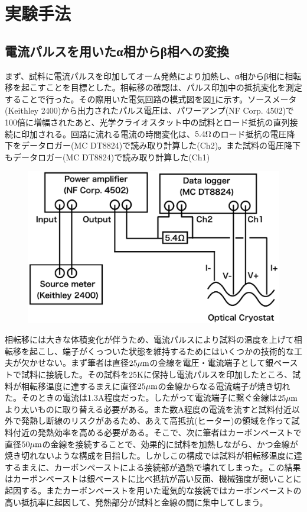 \section{実験手法}
\subsection{電流パルスを用いたα相からβ相への変換}
まず、試料に電流パルスを印加してオーム発熱により加熱し、α相からβ相に相転移を起こすことを目標とした。相転移の確認は、パルス印加中の抵抗変化を測定することで行った。その際用いた電気回路の模式図を図\ref{fig:schematics_pulse}に示す。ソースメータ(Keithley 2400)から出力されたパルス電圧は、パワーアンプ(NF Corp. 4502)で100倍に増幅されたあと、光学クライオスタット中の試料とロード抵抗の直列接続に印加される。回路に流れる電流の時間変化は、$\rm 5.4\Omega$のロード抵抗の電圧降下をデータロガー(MC DT8824)で読み取り計算した(Ch2)。また試料の電圧降下もデータロガー(MC DT8824)で読み取り計算した(Ch1)
\begin{figure}[!h]
    \begin{center}
   \includegraphics[width=0.5\hsize]{experiment/schematics_pulse.eps}
  \end{center}
  \caption{}
  \label{fig:schematics_pulse}
  \end{figure}
  
相転移には大きな体積変化が伴うため、電流パルスにより試料の温度を上げて相転移を起こし、端子がくっついた状態を維持するためにはいくつかの技術的な工夫が欠かせない。まず筆者は直径$\rm 25 \mu m$の金線を電圧・電流端子として銀ペーストで試料に接続した。その試料を25Kに保持し電流パルスを印加したところ、試料が相転移温度に達するまえに直径$\rm 25 \mu m$の金線からなる電流端子が焼き切れた。そのときの電流は1.3A程度だった。したがって電流端子に繋ぐ金線は$\rm 25 \mu m$より太いものに取り替える必要がある。また数A程度の電流を流すと試料付近以外で発熱し断線のリスクがあるため、あえて高抵抗(ヒーター)の領域を作って試料付近の発熱効率を高める必要がある。そこで、次に筆者はカーボンペーストで直径$\rm 50 \mu m$の金線を接続することで、効果的に試料を加熱しながら、かつ金線が焼き切れないような構成を目指した。しかしこの構成では試料が相転移温度に達するまえに、カーボンペーストによる接続部が過熱で壊れてしまった。この結果はカーボンペーストは銀ペーストに比べ抵抗が高い反面、機械強度が弱いことに起因する。またカーボンペーストを用いた電気的な接続ではカーボンペーストの高い抵抗率に起因して、発熱部分が試料と金線の間に集中してしまう。

